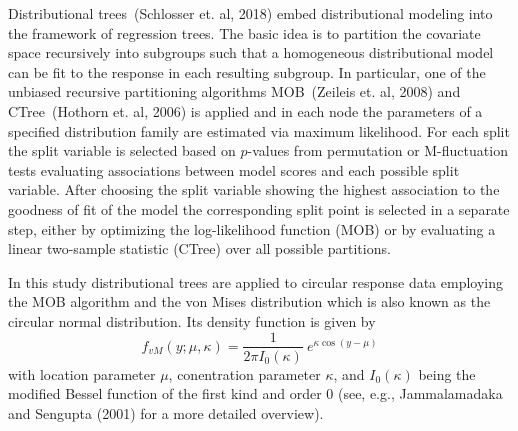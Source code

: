 \documentclass[twoside]{report}
\begin{document}
Distributional trees~(Schlosser et. al, 2018) embed distributional modeling into the framework 
of regression trees.
The basic idea is to partition the covariate space recursively into subgroups 
such that a homogeneous distributional model can be fit to the response in each resulting subgroup.
In particular, one of the unbiased recursive partitioning algorithms MOB~(Zeileis et. al, 2008) 
and CTree~(Hothorn et. al, 2006) is applied and in each node the parameters of a specified 
distribution family are estimated via maximum likelihood.
For each split the split variable is selected based on $p$-values from permutation or M-fluctuation 
tests evaluating associations between model scores and each possible split variable. After choosing 
the split variable showing the highest association to the goodness of fit of the model the corresponding split point is selected in a separate step, either by optimizing the log-likelihood function (MOB)
or by evaluating a linear two-sample statistic (CTree) over all possible partitions.

In this study distributional trees are applied to circular response data employing the MOB algorithm
and the von Mises distribution which is also known as the circular 
normal distribution. Its density function is given by
\begin{equation}
  f_{vM}(y; \mu, \kappa) = \frac{1}{2 \pi I_0(\kappa)}~e^{ \kappa \cos(y - \mu)}\label{equ:vm}
\end{equation}
with location parameter $\mu$, conentration parameter $\kappa$, and $I_0(\kappa)$ being the 
modified Bessel function of the first kind and order $0$
(see, e.g., Jammalamadaka and Sengupta (2001) for a more detailed overview).
\end{document}
